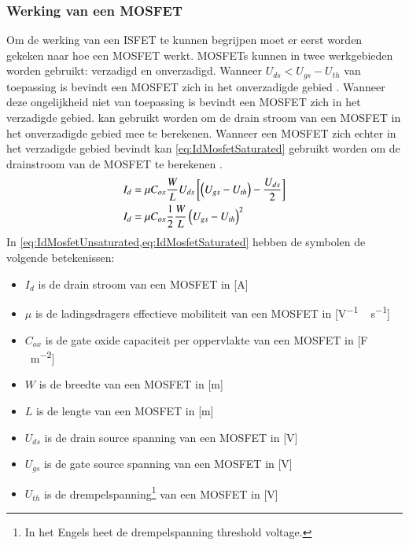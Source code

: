 \subsubsection{Werking van een MOSFET}
Om de werking van een ISFET te kunnen begrijpen moet er eerst worden gekeken naar hoe een MOSFET werkt.
MOSFETs kunnen in twee werkgebieden worden gebruikt: verzadigd en onverzadigd. Wanneer $U_{ds}<U_{gs}-U_{th}$ van toepassing is bevindt een MOSFET zich in het onverzadigde gebied \cite{bergveld1985impactOfMosfetBasedSensors,inleidingInDeElektronicaWissenburgh}. Wanneer deze ongelijkheid niet van toepassing is bevindt een MOSFET zich in het verzadigde gebied.  kan gebruikt worden om de drain stroom van een MOSFET in het onverzadigde gebied mee te berekenen. Wanneer een MOSFET zich echter in het verzadigde gebied bevindt kan \cref{eq:IdMosfetSaturated} gebruikt worden om de drainstroom van de MOSFET te berekenen \cite{elbasfun,inleidingInDeElektronicaWissenburgh,bergveld1985impactOfMosfetBasedSensors,isfetAsAnElectronicDevice,DonaldNeamenSemiconductorPhysicsAndDevicesBasicPrinciples}. %
\begin{align}
    I_d{}&={}\mu C_{ox}\frac{W}{L}U_{ds}\left[\left(U_{gs}-U_{th}\right)-\frac{U_{ds}}{2}\right]
    \tagaddtext{[\si{\ampere}]} \label{eq:IdMosfetUnsaturated}\\
    I_d{}&={}\mu C_{ox}\frac{1}{2}\frac{W}{L}\left(U_{gs}-U_{th}\right)^2
    \tagaddtext{[\si{\ampere}]} \label{eq:IdMosfetSaturated}
\end{align}
In \cref{eq:IdMosfetUnsaturated,eq:IdMosfetSaturated} hebben de symbolen de volgende betekenissen:
\begin{itemize}
    \item $I_d$ is de drain stroom van een MOSFET in [\si{\ampere}]
    \item $\mu$ is de ladingsdragers effectieve mobiliteit van een MOSFET in [\si{\volt^{-1}\,\second^{-1}}]
    \item $C_{ox}$ is de gate oxide capaciteit per oppervlakte van een MOSFET in [\si{\farad\,\meter^{-2}}]
    \item $W$ is de breedte van een MOSFET in [\si{\meter}]
    \item $L$ is de lengte van een MOSFET in [\si{\meter}]
    \item $U_{ds}$ is de drain source spanning van een MOSFET in [\si{\volt}]
    \item $U_{gs}$ is de gate source spanning van een MOSFET in [\si{\volt}]
    \item $U_{th}$ is de drempelspanning\footnote{In het Engels heet de drempelspanning threshold voltage.} van een MOSFET in [\si{\volt}]
\end{itemize}

